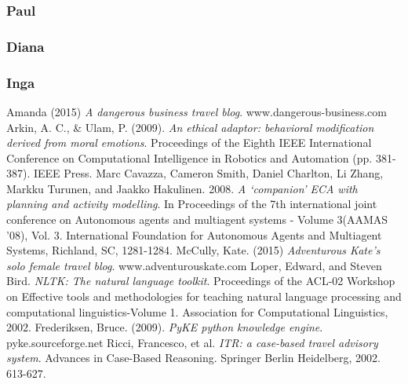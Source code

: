 \documentclass[11pt]{article} %
\begin{document}
\subsubsection{Paul}
\subsubsection{Diana}
\subsubsection{Inga}

\begin{thebibliography}{9}

Amanda (2015) \emph{A dangerous business travel blog}. www.dangerous-business.com
Arkin, A. C., \& Ulam, P. (2009). \emph{An ethical adaptor: behavioral modification derived from moral emotions}. Proceedings of the Eighth IEEE International Conference on Computational Intelligence in Robotics and Automation (pp. 381-387). IEEE Press.
Marc Cavazza, Cameron Smith, Daniel Charlton, Li Zhang, Markku Turunen, and Jaakko Hakulinen. 2008. \emph{A `companion' ECA with planning and activity modelling}. In Proceedings of the 7th international joint conference on Autonomous agents and multiagent systems - Volume 3(AAMAS '08), Vol. 3. International Foundation for Autonomous Agents and Multiagent Systems, Richland, SC, 1281-1284.
McCully, Kate. (2015) \emph{Adventurous Kate's solo female travel blog}. www.adventurouskate.com
Loper, Edward, and Steven Bird. \emph{NLTK: The natural language toolkit}. Proceedings of the ACL-02 Workshop on Effective tools and methodologies for teaching natural language processing and computational linguistics-Volume 1. Association for Computational Linguistics, 2002.
Frederiksen, Bruce. (2009). \emph{PyKE python knowledge engine}. pyke.sourceforge.net
Ricci, Francesco, et al. \emph{ITR: a case-based travel advisory system}. Advances in Case-Based Reasoning. Springer Berlin Heidelberg, 2002. 613-627.


\end{thebibliography}
\end{document}
